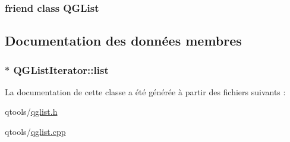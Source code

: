 \subsubsection[{Q\+G\+List}]{\setlength{\rightskip}{0pt plus 5cm}friend class {\bf Q\+G\+List}\hspace{0.3cm}{\ttfamily [friend]}}\label{class_q_g_list_iterator_a9bfde3c3259271cb86b87bd78b399dd5}


\subsection{Documentation des données membres}
\hypertarget{class_q_g_list_iterator_a6e606950ab50b273e8370d9e24756bf2}{}
\subsubsection[{list}]{$\ast$ Q\+G\+List\+Iterator\+::list\hspace{0.3cm}{\ttfamily [protected]}}\label{class_q_g_list_iterator_a6e606950ab50b273e8370d9e24756bf2}


La documentation de cette classe a été générée à partir des fichiers suivants \+:\begin{DoxyCompactItemize}
\item 
qtools/\hyperlink{qglist_8h}{qglist.\+h}\item 
qtools/\hyperlink{qglist_8cpp}{qglist.\+cpp}\end{DoxyCompactItemize}
